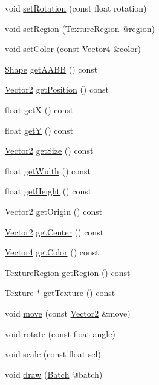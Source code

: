 \begin{DoxyCompactItemize}
void \hyperlink{class_sprite_aad424b86963bde58e6f62074c4b2c037}{set\+Rotation} (const float rotation)
\item 
void \hyperlink{class_sprite_a8605a40678e4454062a6e4be6069d99f}{set\+Region} (\hyperlink{class_texture_region}{Texture\+Region} @region)
\item 
void \hyperlink{class_sprite_aa935c4969fb8bf7aaddfee9cc7427cbc}{set\+Color} (const \hyperlink{class_vector4}{Vector4} \&color)
\item 
\hyperlink{class_shape}{Shape} \hyperlink{class_sprite_aa303c8d552308024a59159da86603fa1}{get\+A\+A\+B\+B} () const 
\item 
\hyperlink{class_vector2}{Vector2} \hyperlink{class_sprite_ab02f4333185e9ecd2830266cce22004d}{get\+Position} () const 
\item 
float \hyperlink{class_sprite_a1460d72f81de90450f8e764a42b28c3c}{get\+X} () const 
\item 
float \hyperlink{class_sprite_ad33dcf1271a60ebfa978e9b6749d39fc}{get\+Y} () const 
\item 
\hyperlink{class_vector2}{Vector2} \hyperlink{class_sprite_a1db7848ab8886b382e56889c2a0195a4}{get\+Size} () const 
\item 
float \hyperlink{class_sprite_a1abb04c6637e0fca05587a36d9ea6b5e}{get\+Width} () const 
\item 
float \hyperlink{class_sprite_a3b2cb4054965bddd89e59e7bb2815f77}{get\+Height} () const 
\item 
\hyperlink{class_vector2}{Vector2} \hyperlink{class_sprite_ac7e4e3b1670311a87c63d5424ec27ea5}{get\+Origin} () const 
\item 
\hyperlink{class_vector2}{Vector2} \hyperlink{class_sprite_a209c829098440c836e4fb10f41bb0aea}{get\+Center} () const 
\item 
\hyperlink{class_vector4}{Vector4} \hyperlink{class_sprite_a6e71e684e6cfaede0262994897dcfbb4}{get\+Color} () const 
\item 
\hyperlink{class_texture_region}{Texture\+Region} \hyperlink{class_sprite_ae53811526e1d3cb0a3bb7c514a582c2f}{get\+Region} () const 
\item 
\hyperlink{class_texture}{Texture} $\ast$ \hyperlink{class_sprite_ae01540b88edcfdc565b5ec06709c6cdd}{get\+Texture} () const 
\item 
void \hyperlink{class_sprite_a8b25650441ad72d3c449494607d8dbda}{move} (const \hyperlink{class_vector2}{Vector2} \&move)
\item 
void \hyperlink{class_sprite_a157bcaff0e3fb4f62ed9ad139a27b0ad}{rotate} (const float angle)
\item 
void \hyperlink{class_sprite_a6400777edb313463aac0a4b60dd1e011}{scale} (const float scl)
\item 
void \hyperlink{class_sprite_a5273752c722df11cbf6f61d7ef9e18bb}{draw} (\hyperlink{class_batch}{Batch} @batch)
\end{DoxyCompactItemize}


